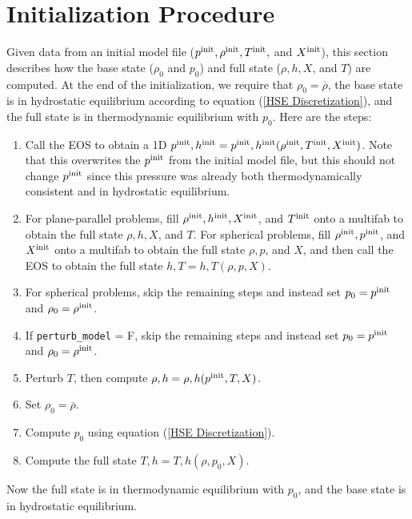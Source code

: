 \documentclass[11pt]{article}
\def\init  {\rm init}
\begin{document}
\section{Initialization Procedure}
Given data from an initial model file ($p^{\init}, \rho^{\init}, T^{\init},$ and $X^{\init}$), this section describes how the base state ($\rho_0$ and $p_0$) and full state ($\rho, h, X$, and $T$) are computed.  At the end of the initialization, we require that $\rho_0 = \overline\rho$, the base state is in hydrostatic equilibrium according to equation (\ref{HSE Discretization}), and the full state is in thermodynamic equilibrium with $p_0$.  Here are the steps:
\begin{enumerate}
\item Call the EOS to obtain a 1D $p^{\init},h^{\init} = p^{\init},h^{\init}(\rho^{\init},T^{\init},X^{\init})$.  Note that this overwrites the $p^{\init}$ from the initial model file, but this should not change $p^{\init}$ since this pressure was already both thermodynamically consistent and in hydrostatic equilibrium.
\item For plane-parallel problems, fill $\rho^{\init}, h^{\init}, X^{\init}$, and $T^{\init}$ onto a multifab to obtain the full state $\rho, h, X$, and $T$.  For spherical problems, fill $\rho^{\init}, p^{\init}$, and $X^{\init}$ onto a multifab to obtain the full state $\rho, p$, and $X$, and then call the EOS to obtain the full state $h,T = h,T(\rho,p,X)$.
\item For spherical problems, skip the remaining steps and instead set $p_0 = p^{\init}$ and $\rho_0 = \rho^{\init}$.
\item If {\tt perturb\_model} = F, skip the remaining steps and instead set $p_0 = p^{\init}$ and $\rho_0 = \rho^{\init}$.
\item Perturb $T$, then compute $\rho,h = \rho,h(p^{\init},T,X)$.
\item Set $\rho_0 = \overline\rho$.
\item Compute $p_0$ using equation (\ref{HSE Discretization}).
\item Compute the full state $T,h = T,h(\rho,p_0,X)$.
\end{enumerate}
Now the full state is in thermodynamic equilibrium with $p_0$, and the base state is in hydrostatic equilibrium.
\end{document}
